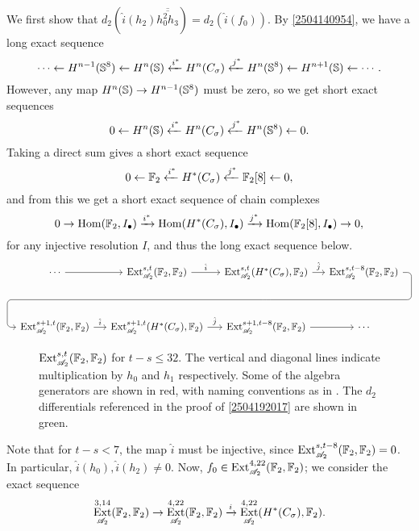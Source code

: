 \documentclass{MetricNotes2023}
\def\bb{\ensuremath\mathbb}
\def\A{\ensuremath{\mathscr{A}_2}}
\DeclareMathOperator{\Ext}{Ext}
\DeclareMathOperator{\Hom}{Hom}
\begin{document}
\begin{ourproof}
We first show that \(d_2(\hat i(h_2) \overline{\overline{h_0^2h_3}})=d_2(\hat i(f_0))\). By \ref{2504140954}, we have a long exact sequence
\[\cdots \leftarrow H^{n-1}(\bb{S}^8) \leftarrow H^n(\bb{S}) \xleftarrow{i^*} H^n(C_\sigma) \xleftarrow{j^*} H^n(\bb{S}^8)\leftarrow H^{n+1}(\bb{S}) \leftarrow \cdots.\]
However, any map \(H^n(\bb{S})\to H^{n-1}(\bb{S}^8)\) must be zero, so we get short exact sequences 
\[0 \leftarrow H^n(\bb{S})\xleftarrow{i^*} H^n(C_\sigma) \xleftarrow{j^*} H^n(\bb{S}^8)\leftarrow 0.\]
Taking a direct sum gives a short exact sequence
\[0 \leftarrow \bb{F}_2 \xleftarrow{i^*} H^*(C_\sigma) \xleftarrow{j^*} \bb{F}_2[8] \leftarrow 0,\]
and from this we get a short exact sequence of chain complexes
\[0 \to \Hom(\bb{F}_2, I_\bullet) \xrightarrow{i^*} \Hom(H^*(C_\sigma), I_\bullet) \xrightarrow{j^*} \Hom(\bb{F}_2[8], I_\bullet)\to 0,\]
for any injective resolution \(I\), and thus the long exact sequence below.
\[\begin{tikzcd}[row sep=8ex, column sep=3ex]
\cdots \arrow[r, ""] & \Ext_{\A}^{s,t}(\bb{F}_2, \bb{F}_2) \arrow[r, "\hat i"] & \Ext_{\A}^{s,t}(H^*(C_\sigma), \bb{F}_2) \arrow[r, "\hat j"] \ar[draw=none]{d}[name=X, anchor=center]{} & \Ext_{\A}^{s,t-8}(\bb{F}_2, \bb{F}_2) \ar[rounded corners, to path={ -- ([xshift=2ex]\tikztostart.east) |- (X.center) \tikztonodes -| ([xshift=-2ex]\tikztotarget.west) -- (\tikztotarget)}]{dlll}[at end]{} \\
\Ext_{\A}^{s+1,t}(\bb{F}_2, \bb{F}_2) \arrow[r, "\hat i"] & \Ext_{\A}^{s+1,t}(H^*(C_\sigma), \bb{F}_2) \arrow[r, "\hat j"] & \Ext_{\A}^{s+1,t-8}(\bb{F}_2, \bb{F}_2) \arrow[r, ""] & \cdots
\end{tikzcd}\]

\begin{landscape}
\begin{figure}
\centering

\caption{\(\Ext^{s,t}_{\A}(\bb{F}_2, \bb{F}_2)\) for \(t-s\leq 32\). The vertical and diagonal lines indicate multiplication by \(h_0\) and \(h_1\) respectively. Some of the algebra generators are shown in red, with naming conventions as in \autocite{rognes2}. The \(d_2\) differentials referenced in the proof of \ref{2504192017} are shown in green.}
\label{2504201924}
\end{figure}
\end{landscape}

Note that for \(t-s<7\), the map \(\hat i\) must be injective, since \(\Ext_{\A}^{s,t-8}(\bb{F}_2, \bb{F}_2)=0\). In particular, \(\hat i(h_0), \hat i(h_2)\neq 0\). 
Now, \(f_0\in \Ext_{\A}^{4,22}(\bb{F}_2, \bb{F}_2)\); we consider the exact sequence
\[\Ext_{\A}^{3,14}(\bb{F}_2, \bb{F}_2)\to \Ext_{\A}^{4,22}(\bb{F}_2, \bb{F}_2) \xrightarrow{i} \Ext_{\A}^{4,22}(H^*(C_\sigma), \bb{F}_2).\]


\end{ourproof}
\end{document}
